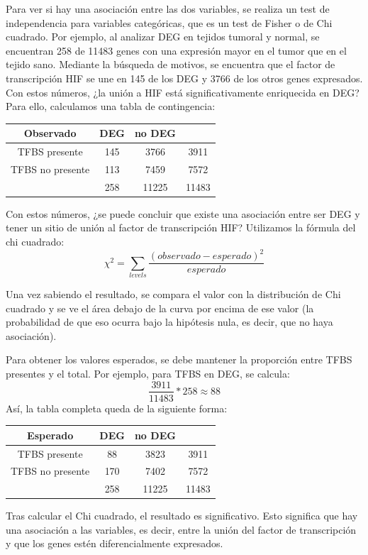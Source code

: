 Para ver si hay una asociación entre las dos variables, se realiza un test de independencia para variables categóricas, que es un test de Fisher o de Chi cuadrado. Por ejemplo, al analizar DEG en tejidos tumoral y normal, se encuentran 258 de 11483 genes con una expresión mayor en el tumor que en el tejido sano. Mediante la búsqueda de motivos, se encuentra que el factor de transcripción HIF se une en 145 de los DEG y 3766 de los otros genes expresados. Con estos números, ¿la unión a HIF está significativamente enriquecida en DEG? Para ello, calculamos una tabla de contingencia:
\begin{table}[htbp]
\centering
\begin{tabular}{c | c c | c}
Observado & DEG & no DEG & \\ \hline
TFBS presente & 145 & 3766 & 3911 \\
TFBS no presente & 113 & 7459 & 7572 \\ \hline
& 258 & 11225 & 11483
\end{tabular}
\end{table}

Con estos números, ¿se puede concluir que existe una asociación entre ser DEG y tener un sitio de unión al factor de transcripción HIF? Utilizamos la fórmula del chi cuadrado:
$$ \chi^2 = \sum_{levels} \frac{(observado-esperado)^2}{esperado}$$

Una vez sabiendo el resultado, se compara el valor con la distribución de Chi cuadrado y se ve el área debajo de la curva por encima de ese valor (la probabilidad de que eso ocurra bajo la hipótesis nula, es decir, que no haya asociación). 

Para obtener los valores esperados, se debe mantener la proporción entre TFBS presentes y el total. Por ejemplo, para TFBS en DEG, se calcula:
$$\frac{3911}{11483} * 258 \approx 88$$
Así, la tabla completa queda de la siguiente forma:
\begin{table}[htbp]
\centering
\begin{tabular}{c | c c | c}
Esperado & DEG & no DEG & \\ \hline
TFBS presente & 88 & 3823 & 3911 \\
TFBS no presente & 170 & 7402 & 7572 \\ \hline
& 258 & 11225 & 11483
\end{tabular}
\end{table}

Tras calcular el Chi cuadrado, el resultado es significativo. Esto significa que hay una asociación a las variables, es decir, entre la unión del factor de transcripción y que los genes estén diferencialmente expresados. 

